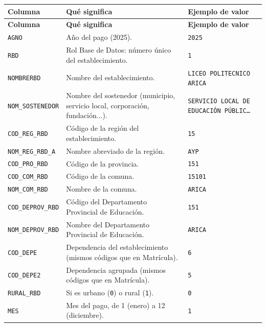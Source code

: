 \documentclass[10.5pt]{article}
\newcommand{\hdr}[1]{\textbf{\color{white}#1}}
\begin{document}
\begin{xltabular}{\linewidth}{@{}p{4.5cm} >{\raggedright\arraybackslash}X p{3.4cm}@{}}
\hdr{Columna} & \hdr{Qué significa} & \hdr{Ejemplo de valor} \\
\endfirsthead
{}\hdr{Columna} & \hdr{Qué significa} & \hdr{Ejemplo de valor} \\
\endhead
\texttt{AGNO} & Año del pago (2025). & \texttt{2025} \\
\texttt{RBD} & Rol Base de Datos: número único del establecimiento. & \texttt{1} \\
\texttt{NOMBRERBD} & Nombre del establecimiento. & \texttt{LICEO POLITECNICO ARICA} \\
\texttt{NOM\_\allowbreak{}SOSTENEDOR} & Nombre del sostenedor (municipio, servicio local, corporación, fundación...). & \texttt{SERVICIO LOCAL DE EDUCACIÓN PÚBLIC…} \\
\texttt{COD\_\allowbreak{}REG\_\allowbreak{}RBD} & Código de la región del establecimiento. & \texttt{15} \\
\texttt{NOM\_\allowbreak{}REG\_\allowbreak{}RBD\_\allowbreak{}A} & Nombre abreviado de la región. & \texttt{AYP} \\
\texttt{COD\_\allowbreak{}PRO\_\allowbreak{}RBD} & Código de la provincia. & \texttt{151} \\
\texttt{COD\_\allowbreak{}COM\_\allowbreak{}RBD} & Código de la comuna. & \texttt{15101} \\
\texttt{NOM\_\allowbreak{}COM\_\allowbreak{}RBD} & Nombre de la comuna. & \texttt{ARICA} \\
\texttt{COD\_\allowbreak{}DEPROV\_\allowbreak{}RBD} & Código del Departamento Provincial de Educación. & \texttt{151} \\
\texttt{NOM\_\allowbreak{}DEPROV\_\allowbreak{}RBD} & Nombre del Departamento Provincial de Educación. & \texttt{ARICA} \\
\texttt{COD\_\allowbreak{}DEPE} & Dependencia del establecimiento (mismos códigos que en Matrícula). & \texttt{6} \\
\texttt{COD\_\allowbreak{}DEPE2} & Dependencia agrupada (mismos códigos que en Matrícula). & \texttt{5} \\
\texttt{RURAL\_\allowbreak{}RBD} & Si es urbano (\texttt{0}) o rural (\texttt{1}). & \texttt{0} \\
\texttt{MES} & Mes del pago, de 1 (enero) a 12 (diciembre). & \texttt{1} \\

\end{xltabular}
\end{document}
